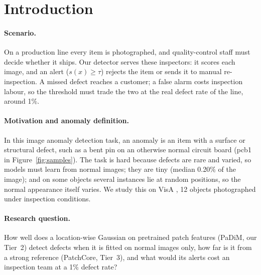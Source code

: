\section{Introduction}
\label{sec:intro}

\paragraph{Scenario.}
On a production line every item is photographed, and quality-control staff must decide whether it ships.
Our detector serves these inspectors: it scores each image, and an alert ($s(x) \ge \tau$) rejects the
item or sends it to manual re-inspection.
A missed defect reaches a customer; a false alarm costs inspection labour, so the threshold must trade
the two at the real defect rate of the line, around 1\%.

\paragraph{Motivation and anomaly definition.}
In this image anomaly detection task, an anomaly is an item with a surface or structural defect, such
as a bent pin on an otherwise normal circuit board (pcb1 in Figure~\ref{fig:samples}).
The task is hard because defects are rare and varied, so models must learn from normal images; they are
tiny (median 0.20\% of the image); and on some objects several instances lie at random positions, so
the normal appearance itself varies.
We study this on VisA \citep{zou2022spot}, 12 objects photographed under inspection conditions.

\paragraph{Research question.}
How well does a location-wise Gaussian on pretrained patch features (PaDiM, our Tier~2) detect defects
when it is fitted on normal images only, how far is it from a strong reference (PatchCore, Tier~3), and
what would its alerts cost an inspection team at a 1\% defect rate?


